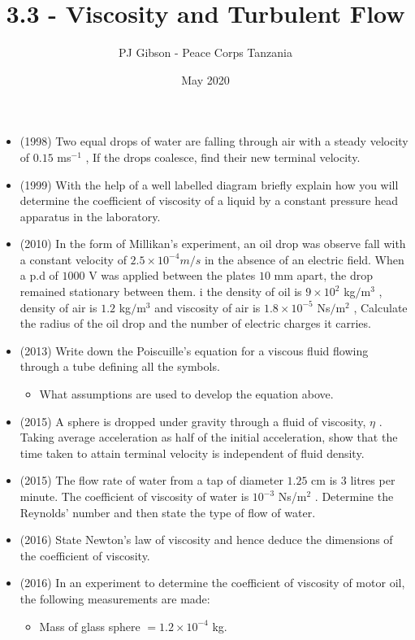 \documentclass{article}
\title{\textbf{3.3 - Viscosity and Turbulent Flow}}
\author{PJ Gibson - Peace Corps Tanzania}
\date{May 2020}
\begin{document}
\maketitle

\begin{itemize}
\item (1998)  Two equal drops of water are falling through air with a steady velocity of $ 0.15$ ms$ ^{-1}$ , If the drops coalesce, find their new terminal velocity.
\item (1999)  With the help of a well labelled diagram briefly explain how you will determine the coefficient of viscosity of a liquid by a constant pressure head apparatus in the laboratory.
\item (2010)  In the form of Millikan’s experiment, an oil drop was observe fall with a constant velocity of $ 2.5	\times 10^{-4}m/s$ in the absence of an electric field. When a p.d of $ 1000$ V was applied between the plates $ 10$ mm apart, the drop remained stationary between them. i the density of oil is $ 9 \times 10^{2}$ kg$/$m$ ^{3}$ , density of air is $ 1.2$ kg$/$m$ ^{3}$ and viscosity of air is $ 1.8\times 10^{-5}$ Ns$/$m$ ^{2}$ , Calculate the radius of the oil drop and the number of electric charges it carries.
\item (2013)  Write down the Poiscuille’s equation for a viscous fluid flowing through a tube defining all the symbols.
 \begin{itemize}
\item What assumptions are used to develop the equation above. 
\end{itemize}
\item (2015)  A sphere is dropped under gravity through a fluid of viscosity, $ \eta $ .  Taking average acceleration as half of the initial acceleration, show that the time taken to attain terminal velocity is independent of fluid density.
\item (2015)  The flow rate of water from a tap of diameter $ 1.25$ cm is $ 3$ litres per minute.  The coefficient of viscosity of water is $ 10^{-3}$ Ns/m$ ^{2}$ .  Determine the Reynolds’ number and then state the type of flow of water.
\item (2016)  State Newton’s law of viscosity and hence deduce the dimensions of the coefficient of viscosity.
\item (2016)  In an experiment to determine the coefficient of viscosity of motor oil, the following measurements are made:
 \begin{itemize}
\item Mass of glass sphere $ =1.2 \times 10^{-4}$ kg.

\end{itemize}
\end{itemize}
\end{document}

